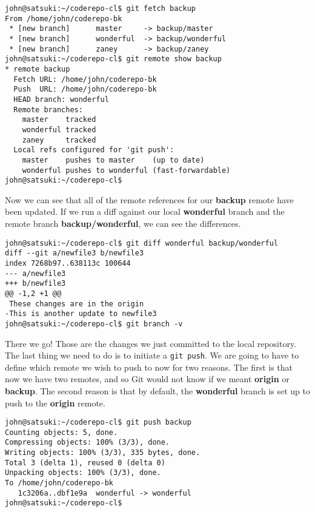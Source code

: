\begin{Verbatim}[frame=leftline,framerule=1mm,fontsize=\relsize{-3}] 
john@satsuki:~/coderepo-cl$ git fetch backup
From /home/john/coderepo-bk
 * [new branch]      master     -> backup/master
 * [new branch]      wonderful  -> backup/wonderful
 * [new branch]      zaney      -> backup/zaney
john@satsuki:~/coderepo-cl$ git remote show backup
* remote backup
  Fetch URL: /home/john/coderepo-bk
  Push  URL: /home/john/coderepo-bk
  HEAD branch: wonderful
  Remote branches:
    master    tracked
    wonderful tracked
    zaney     tracked
  Local refs configured for 'git push':
    master    pushes to master    (up to date)
    wonderful pushes to wonderful (fast-forwardable)
john@satsuki:~/coderepo-cl$ 
\end{Verbatim}

Now we can see that all of the remote references for our \textbf{backup} remote have been updated.  If we run a diff against our local \textbf{wonderful} branch and the remote branch \textbf{backup/wonderful}, we can see the differences.

\begin{Verbatim}[frame=leftline,framerule=1mm,fontsize=\relsize{-3}] 
john@satsuki:~/coderepo-cl$ git diff wonderful backup/wonderful 
diff --git a/newfile3 b/newfile3
index 7268b97..638113c 100644
--- a/newfile3
+++ b/newfile3
@@ -1,2 +1 @@
 These changes are in the origin
-This is another update to newfile3
john@satsuki:~/coderepo-cl$ git branch -v
\end{Verbatim}

There we go!  Those are the changes we just committed to the local repository.  The last thing we need to do is to initiate a \texttt{git push}.  We are going to have to define which remote we wish to push to now for two reasons.  The first is that now we have two remotes, and so Git would not know if we meant \textbf{origin} or \textbf{backup}.  The second reason is that by default, the \textbf{wonderful} branch is set up to push to the \textbf{origin} remote.

\begin{Verbatim}[frame=leftline,framerule=1mm,fontsize=\relsize{-3}] 
john@satsuki:~/coderepo-cl$ git push backup
Counting objects: 5, done.
Compressing objects: 100% (3/3), done.
Writing objects: 100% (3/3), 335 bytes, done.
Total 3 (delta 1), reused 0 (delta 0)
Unpacking objects: 100% (3/3), done.
To /home/john/coderepo-bk
   1c3206a..dbf1e9a  wonderful -> wonderful
john@satsuki:~/coderepo-cl$ 
\end{Verbatim}

